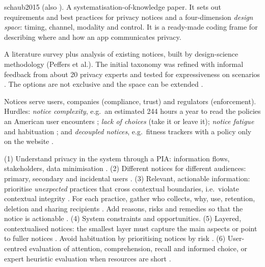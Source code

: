 \begin{papercard}{schaub2015}
   (also  ). A systematisation-of-knowledge paper. It sets out requirements and best practices for privacy notices and a four-dimension \emph{design space}: timing, channel, modality and control. It is a ready-made coding frame for describing where and how an app communicates privacy.

 A literature survey plus analysis of existing notices, built by design-science methodology (Peffers et al.). The initial taxonomy was refined with informal feedback from about 20 privacy experts and tested for expressiveness on scenarios . The options are not exclusive and the space can be extended .

 Notices serve users, companies (compliance, trust) and regulators (enforcement). Hurdles: \emph{notice complexity}, e.g.\ an estimated 244 hours a year to read the policies an American user encounters ; \emph{lack of choices} (take it or leave it); \emph{notice fatigue} and habituation ; and \emph{decoupled notices}, e.g.\ fitness trackers with a policy only on the website .

 (1) Understand privacy in the system through a PIA: information flows, stakeholders, data minimisation . (2) Different notices for different audiences: primary, secondary and incidental users . (3) Relevant, actionable information: prioritise \emph{unexpected} practices that cross contextual boundaries, i.e.\ violate contextual integrity . For each practice, gather who collects, why, use, retention, deletion and sharing recipients . Add reasons, risks and remedies so that the notice is actionable . (4) System constraints and opportunities. (5) Layered, contextualised notices: the smallest layer must capture the main aspects or point to fuller notices . Avoid habituation by prioritising notices by risk . (6) User-centred evaluation of attention, comprehension, recall and informed choice, or expert heuristic evaluation when resources are short .


\end{papercard}
